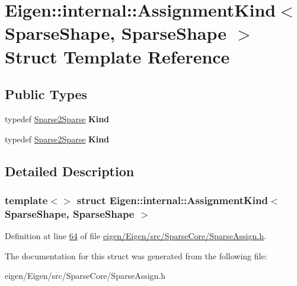 \hypertarget{struct_eigen_1_1internal_1_1_assignment_kind_3_01_sparse_shape_00_01_sparse_shape_01_4}{}\section{Eigen\+:\+:internal\+:\+:Assignment\+Kind$<$ Sparse\+Shape, Sparse\+Shape $>$ Struct Template Reference}
\label{struct_eigen_1_1internal_1_1_assignment_kind_3_01_sparse_shape_00_01_sparse_shape_01_4}
\subsection*{Public Types}
\begin{DoxyCompactItemize}
\item 
\mbox{\label{struct_eigen_1_1internal_1_1_assignment_kind_3_01_sparse_shape_00_01_sparse_shape_01_4_a3edbf9cc71c05d8e5c3eda23ca95ac63}} 
typedef \hyperlink{struct_eigen_1_1internal_1_1_sparse2_sparse}{Sparse2\+Sparse} {\bfseries Kind}
\item 
\mbox{\label{struct_eigen_1_1internal_1_1_assignment_kind_3_01_sparse_shape_00_01_sparse_shape_01_4_a3edbf9cc71c05d8e5c3eda23ca95ac63}} 
typedef \hyperlink{struct_eigen_1_1internal_1_1_sparse2_sparse}{Sparse2\+Sparse} {\bfseries Kind}
\end{DoxyCompactItemize}


\subsection{Detailed Description}
\subsubsection*{template$<$$>$\newline
struct Eigen\+::internal\+::\+Assignment\+Kind$<$ Sparse\+Shape, Sparse\+Shape $>$}



Definition at line \hyperlink{eigen_2_eigen_2src_2_sparse_core_2_sparse_assign_8h_source_l00064}{64} of file \hyperlink{eigen_2_eigen_2src_2_sparse_core_2_sparse_assign_8h_source}{eigen/\+Eigen/src/\+Sparse\+Core/\+Sparse\+Assign.\+h}.



The documentation for this struct was generated from the following file\+:\begin{DoxyCompactItemize}
\item 
eigen/\+Eigen/src/\+Sparse\+Core/\+Sparse\+Assign.\+h\end{DoxyCompactItemize}
